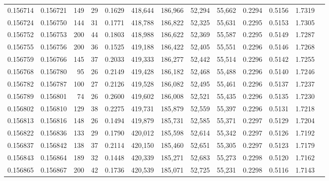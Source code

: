 \begin{tabular}{rrrrrrrrrrrrr}
0.156714 & 0.156721 &   149 &  29 &                                     0.1629 & 418,644 & 186,966 &  52,294 &  55,662 & 0.2294 & 0.5156 & 1.7319 \\
0.156724 & 0.156750 &   144 &  31 &                                     0.1771 & 418,788 & 186,822 &  52,325 &  55,631 & 0.2295 & 0.5153 & 1.7305 \\
0.156752 & 0.156753 &   200 &  44 &                                     0.1803 & 418,988 & 186,622 &  52,369 &  55,587 & 0.2295 & 0.5149 & 1.7287 \\
0.156755 & 0.156756 &   200 &  36 &                                     0.1525 & 419,188 & 186,422 &  52,405 &  55,551 & 0.2296 & 0.5146 & 1.7268 \\
0.156759 & 0.156766 &   145 &  37 &                                     0.2033 & 419,333 & 186,277 &  52,442 &  55,514 & 0.2296 & 0.5142 & 1.7255 \\
0.156768 & 0.156780 &    95 &  26 &                                     0.2149 & 419,428 & 186,182 &  52,468 &  55,488 & 0.2296 & 0.5140 & 1.7246 \\
0.156782 & 0.156787 &   100 &  27 &                                     0.2126 & 419,528 & 186,082 &  52,495 &  55,461 & 0.2296 & 0.5137 & 1.7237 \\
0.156789 & 0.156801 &    74 &  26 &                                     0.2600 & 419,602 & 186,008 &  52,521 &  55,435 & 0.2296 & 0.5135 & 1.7230 \\
0.156802 & 0.156810 &   129 &  38 &                                     0.2275 & 419,731 & 185,879 &  52,559 &  55,397 & 0.2296 & 0.5131 & 1.7218 \\
0.156813 & 0.156816 &   148 &  26 &                                     0.1494 & 419,879 & 185,731 &  52,585 &  55,371 & 0.2297 & 0.5129 & 1.7204 \\
0.156822 & 0.156836 &   133 &  29 &                                     0.1790 & 420,012 & 185,598 &  52,614 &  55,342 & 0.2297 & 0.5126 & 1.7192 \\
0.156837 & 0.156842 &   138 &  37 &                                     0.2114 & 420,150 & 185,460 &  52,651 &  55,305 & 0.2297 & 0.5123 & 1.7179 \\
0.156843 & 0.156864 &   189 &  32 &                                     0.1448 & 420,339 & 185,271 &  52,683 &  55,273 & 0.2298 & 0.5120 & 1.7162 \\
0.156865 & 0.156867 &   200 &  42 &                                     0.1736 & 420,539 & 185,071 &  52,725 &  55,231 & 0.2298 & 0.5116 & 1.7143 \\

\end{tabular}
